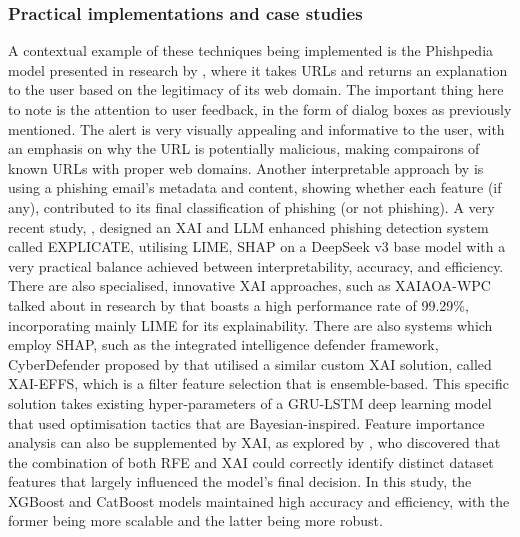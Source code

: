 
\subsubsection*{Practical implementations and case studies}
A contextual example of these techniques being implemented is the Phishpedia model presented in research by \cite{lin2021phishpedia}, where it takes URLs and returns an explanation to the user based on the legitimacy of its web domain. The important thing here to note is the attention to user feedback, in the form of dialog boxes as previously mentioned. The alert is very visually appealing and informative to the user, with an emphasis on why the URL is potentially malicious, making compairons of known URLs with proper web domains. Another interpretable approach by \cite{bravo2010bridging} is using a phishing email's metadata and content, showing whether each feature (if any), contributed to its final classification of phishing (or not phishing). A very recent study, \cite{lim2025explicate}, designed an XAI and LLM enhanced phishing detection system called EXPLICATE, utilising LIME, SHAP on a DeepSeek v3 base model with a very practical balance achieved between interpretability, accuracy, and efficiency. There are also specialised, innovative XAI approaches, such as XAIAOA-WPC talked about in research by \cite{alotaibi2025explainable} that boasts a high performance rate of 99.29\%, incorporating mainly LIME for its explainability. There are also systems which employ SHAP, such as the integrated intelligence defender framework, CyberDefender proposed by \cite{krishnaveni2024cyberdefender} that utilised a similar custom XAI solution, called XAI-EFFS, which is a filter feature selection that is ensemble-based. This specific solution takes existing hyper-parameters of a GRU-LSTM deep learning model that used optimisation tactics that are Bayesian-inspired. Feature importance analysis can also be supplemented by XAI, as explored by \cite{fajar2024enhancing}, who discovered that the combination of both RFE and XAI could correctly identify distinct dataset features that largely influenced the model's final decision. In this study, the XGBoost and CatBoost models maintained high accuracy and efficiency, with the former being more scalable and the latter being more robust.
